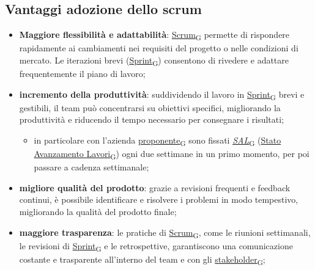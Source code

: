 \subsection{Vantaggi adozione dello scrum}
\begin{itemize}
	\item \textbf{Maggiore flessibilità e adattabilità}: \href{https://7last.github.io/docs/pb/documentazione-interna/glossario\#scrum}{Scrum\textsubscript{G}} permette di rispondere rapidamente ai cambiamenti nei requisiti del progetto o nelle condizioni di mercato. Le iterazioni brevi (\href{https://7last.github.io/docs/pb/documentazione-interna/glossario\#sprint}{Sprint\textsubscript{G}}) consentono di rivedere e adattare frequentemente il piano di lavoro;
	\item \textbf{incremento della produttività}: suddividendo il lavoro in \href{https://7last.github.io/docs/pb/documentazione-interna/glossario\#sprint}{Sprint\textsubscript{G}} brevi e gestibili, il team può concentrarsi su obiettivi specifici, migliorando la produttività e riducendo il tempo necessario per consegnare i risultati;
	      \begin{itemize}
		      \item in particolare con l’azienda \href{https://7last.github.io/docs/pb/documentazione-interna/glossario\#proponente}{proponente\textsubscript{G}} sono fissati \href{https://7last.github.io/docs/pb/documentazione-interna/glossario\#stato-avanzamento-lavori}{\textit{SAL}\textsubscript{G}} (\href{https://7last.github.io/docs/pb/documentazione-interna/glossario\#stato-avanzamento-lavori}{Stato Avanzamento Lavori\textsubscript{G}}) ogni due settimane in un primo momento, per poi passare a cadenza settimanale;
	      \end{itemize}
	\item \textbf{migliore qualità del prodotto}: grazie a revisioni frequenti e feedback continui, è possibile identificare e risolvere i problemi in modo tempestivo, migliorando la qualità del prodotto finale;
	\item \textbf{maggiore trasparenza}: le pratiche di \href{https://7last.github.io/docs/pb/documentazione-interna/glossario\#scrum}{Scrum\textsubscript{G}}, come le riunioni settimanali, le revisioni di \href{https://7last.github.io/docs/pb/documentazione-interna/glossario\#sprint}{Sprint\textsubscript{G}} e le retrospettive, garantiscono una comunicazione costante e trasparente all'interno del team e con gli \href{https://7last.github.io/docs/pb/documentazione-interna/glossario\#stakeholder}{stakeholder\textsubscript{G}};

\end{itemize}
